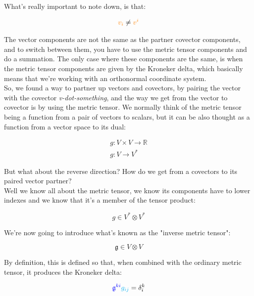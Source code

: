 What's really important to note down, is that:

\begin{equation}
    \begingroup\color{orange}v_i\endgroup \neq \begingroup\color{orange}v^i\endgroup
\end{equation}

The vector components are not the same as the partner covector components, and to switch between them, 
you have to use the metric tensor components and do a summation.
The only case where these components are the same, is when the metric tensor components are given by the 
Kroneker delta, which basically means that we're working with an orthonormal coordinate system.\\

So, we found a way to partner up vectors and covectors, by pairing the vector with the covector \textit{v-dot-something}, and 
the way we get from the vector to covector is by using the metric tensor.
We normally think of the metric tensor being a function from a pair of vectors to scalars, but
it can be also thought as a function from a vector space to its dual:

\begin{align*}
    g : V \times V \to \mathbb{R}\\
    g : V \to V^*
\end{align*}

But what about the reverse direction? How do we get from a covectors to its paired vector partner?\\
Well we know all about the metric tensor, we know its components have to lower indexes and we know that
it's a member of the tensor product:

\begin{equation}
    g \in V^* \otimes V^*
\end{equation}

We're now going to introduce what's known as the "inverse metric tensor":

\begin{equation}
    \mathfrak{g} \in V \otimes V
\end{equation}

By definition, this is defined so that, when combined with the ordinary metric tensor, it produces the Kroneker delta:

\begin{equation}
    \begingroup\color{blue}\mathfrak{g}^{ki}\endgroup \begingroup\color{cyan}g_{ij}\endgroup = \delta^k_i
\end{equation}

